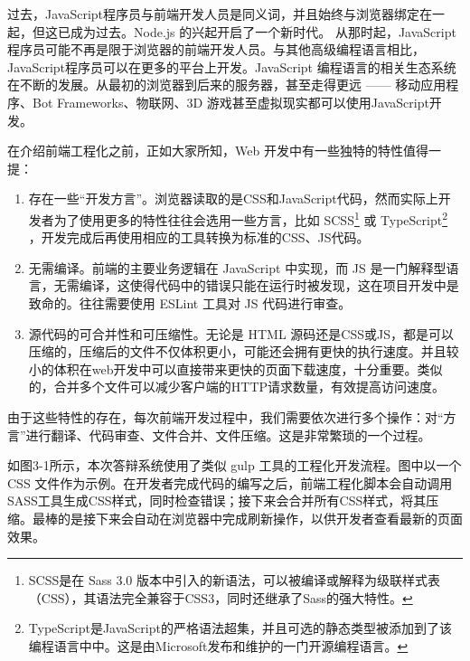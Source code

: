 过去，JavaScript程序员与前端开发人员是同义词，并且始终与浏览器绑定在一起，但这已成为过去。Node.js 的兴起开启了一个新时代。 从那时起，JavaScript 程序员可能不再是限于浏览器的前端开发人员。与其他高级编程语言相比，JavaScript程序员可以在更多的平台上开发。JavaScript 编程语言的相关生态系统在不断的发展。从最初的浏览器到后来的服务器，甚至走得更远 —— 移动应用程序、Bot Frameworks、物联网、3D 游戏甚至虚拟现实都可以使用JavaScript开发。

在介绍前端工程化之前，正如大家所知，Web 开发中有一些独特的特性值得一提：

\begin{enumerate}
	\item 存在一些“开发方言”。浏览器读取的是CSS和JavaScript代码，然而实际上开发者为了使用更多的特性往往会选用一些方言，比如
	SCSS\footnote{SCSS是在 Sass 3.0 版本中引入的新语法，可以被编译或解释为级联样式表（CSS），其语法完全兼容于CSS3，同时还继承了Sass的强大特性。}
	或
	TypeScript\footnote{TypeScript是JavaScript的严格语法超集，并且可选的静态类型被添加到了该编程语言中中。这是由Microsoft发布和维护的一门开源编程语言。}
	，开发完成后再使用相应的工具转换为标准的CSS、JS代码。
	\item 无需编译。前端的主要业务逻辑在 JavaScript 中实现，而 JS 是一门解释型语言，无需编译，这使得代码中的错误只能在运行时被发现，这在项目开发中是致命的。往往需要使用 ESLint 工具对 JS 代码进行审查。
	\item 源代码的可合并性和可压缩性。无论是 HTML 源码还是CSS或JS，都是可以压缩的，压缩后的文件不仅体积更小，可能还会拥有更快的执行速度。并且较小的体积在web开发中可以直接带来更快的页面下载速度，十分重要。类似的，合并多个文件可以减少客户端的HTTP请求数量，有效提高访问速度。
\end{enumerate}

由于这些特性的存在，每次前端开发过程中，我们需要依次进行多个操作：对“方言”进行翻译、代码审查、文件合并、文件压缩。这是非常繁琐的一个过程。

如图3-1所示，本次答辩系统使用了类似 gulp 工具的工程化开发流程。图中以一个 CSS 文件作为示例。在开发者完成代码的编写之后，前端工程化脚本会自动调用SASS工具生成CSS样式，同时检查错误；接下来会合并所有CSS样式，将其压缩。最棒的是接下来会自动在浏览器中完成刷新操作，以供开发者查看最新的页面效果。

